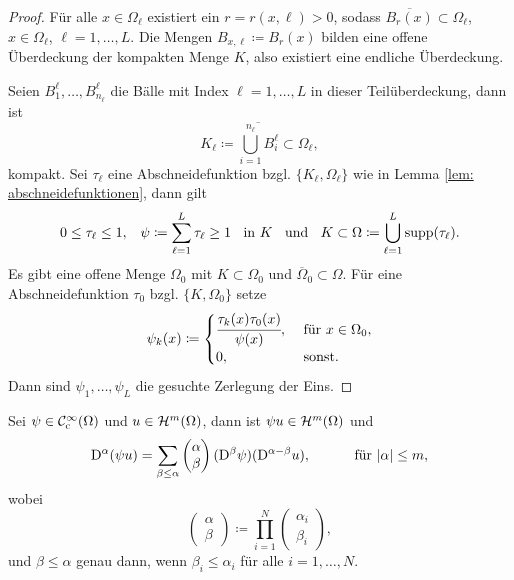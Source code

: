 \begin{proof}
	Für alle \(x\in\Omega_\ell\) existiert ein \(r=r(x,\ell)>0\), sodass \(\overline{B_r(x)}\subset\Omega_\ell\), \(x\in\Omega_\ell\), \(\ell=1,\ldots,L\). Die Mengen \(B_{x,\ell}\coloneqq B_r(x)\) bilden eine offene Überdeckung der kompakten Menge \(K\), also existiert eine endliche Überdeckung.
	
	Seien \(B_1^\ell,\ldots,B_{n_\ell}^\ell\) die Bälle mit Index \(\ell=1,\ldots,L\) in dieser Teilüberdeckung, dann ist
	\begin{equation*}
		K_\ell\coloneqq\overline{\bigcup_{i=1}^{n_\ell}B_i^{\ell}}\subset\Omega_\ell,
	\end{equation*}
	kompakt. Sei \(\tau_\ell\) eine Abschneidefunktion bzgl. \(\{K_\ell,\Omega_\ell\}\) wie in Lemma \ref{lem: abschneidefunktionen}, dann gilt
	\begin{equation*}
		0\leq\tau_\ell\leq1,\;\;\;\psi\coloneqq\sum_{\ell=1}^L\tau_\ell\geq1\;\;\text{ in }K\;\;\text{ und }\;\;K\subset\Omega\coloneqq\bigcup_{\ell=1}^L\operatorname{supp}(\tau_\ell).
	\end{equation*}
	Es gibt eine offene Menge \(\Omega_0\) mit \(K\subset\Omega_0\) und \(\overline{\Omega}_0\subset\Omega\). Für eine Abschneidefunktion \(\tau_0\) bzgl. \(\{K,\Omega_0\}\) setze
	\begin{equation*}
		\psi_k(x)\coloneqq
		\begin{cases}
			\cfrac{\tau_k(x)\tau_0(x)}{\psi(x)},&\text{ für }x\in\Omega_0,\\
			0,&\text{ sonst.}
		\end{cases}
	\end{equation*}
	Dann sind \(\psi_1,\ldots,\psi_L\) die gesuchte Zerlegung der Eins.
\end{proof}
\begin{lem}[Produktregel]\label{lem: produktregel}
	Sei \(\psi\in\mathcal{C}_{\mathrm{c}}^\infty(\Omega)\) und \(u\in\mathcal{H}^m(\Omega)\), dann ist \(\psi u\in\mathcal{H}^m(\Omega)\) und 
	\begin{equation*}
		\mathrm{D}^\alpha(\psi u)=\sum_{\beta\leq\alpha}\begin{pmatrix}\alpha\\\beta\end{pmatrix}(\mathrm{D}^\beta\psi)(\mathrm{D}^{\alpha-\beta}u),\;\;\;\;\;\;\;\;\;\;\text{ für }|\alpha|\leq m,
	\end{equation*}
	wobei
	\begin{equation*}
		\begin{pmatrix}\alpha\\\beta\end{pmatrix}\coloneqq\prod_{i=1}^N\begin{pmatrix}\alpha_i\\\beta_i\end{pmatrix},
	\end{equation*}
	und \(\beta\leq\alpha\) genau dann, wenn \(\beta_i\leq\alpha_i\) für alle \(i=1,\ldots,N\).
\end{lem}
